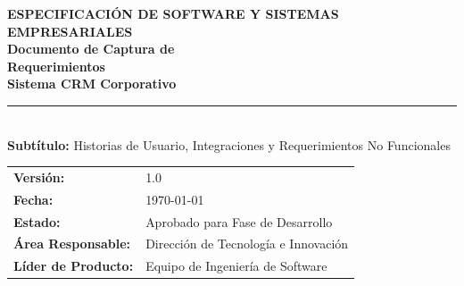 \hypersetup{pageanchor=false}
\begin{titlepage}
    \pagecolor{white}
    
    \vspace*{1.5cm}
    \begin{flushleft}
        \hspace*{1.2cm}
        \begin{minipage}{0.88\textwidth}
            {\large\sffamily\textcolor{SecondarySteel}{\textbf{ESPECIFICACIÓN DE SOFTWARE Y SISTEMAS EMPRESARIALES}}}\\[0.4cm]
            {\Huge\sffamily\bfseries\textcolor{PrimaryNavy}{Documento de Captura de}}\\[0.2cm]
            {\Huge\sffamily\bfseries\textcolor{PrimaryNavy}{Requerimientos}}\\[0.4cm]
            {\LARGE\sffamily\bfseries\textcolor{SecondarySteel}{Sistema CRM Corporativo}}\\[0.8cm]
            
            \noindent\textcolor{SecondarySteel}{\rule{\linewidth}{1.5pt}}\\[0.8cm]
            
            {\large\sffamily\textcolor{DarkText}{\textbf{Subtítulo:}} Historias de Usuario, Integraciones y Requerimientos No Funcionales}\\[1.5cm]
            
            \begin{tcolorbox}[
                colback=BgSoftGray,
                colframe=BorderGray,
                arc=2mm,
                boxrule=1pt,
                left=15pt,
                right=15pt,
                top=12pt,
                bottom=12pt
            ]
                \sffamily
                \begin{tabular}{ll}
                    \textbf{\textcolor{PrimaryNavy}{Versión:}} & 1.0 \\[4pt]
                    \textbf{\textcolor{PrimaryNavy}{Fecha:}} & \today \\[4pt]
                    \textbf{\textcolor{PrimaryNavy}{Estado:}} & Aprobado para Fase de Desarrollo \\[4pt]
                    \textbf{\textcolor{PrimaryNavy}{Área Responsable:}} & Dirección de Tecnología e Innovación \\[4pt]
                    \textbf{\textcolor{PrimaryNavy}{Líder de Producto:}} & Equipo de Ingeniería de Software
                \end{tabular}
            \end{tcolorbox}
            

\end{minipage}
\end{flushleft}
\end{titlepage}
